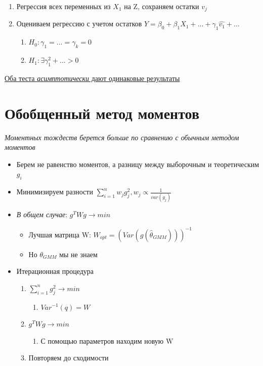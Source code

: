 \documentclass[a4paper, 12pt]{article}
\begin{document}
\begin{enumerate}
    \item Регрессия всех переменных из $X_{1}$ на Z, сохраняем остатки $v_{j}$
    \item Оцениваем регрессию с учетом остатков $Y = \beta_{0} + \beta_{1}X_{1} + ... + \gamma_{1}\hat{v_{1}} + ...$
    \begin{enumerate}
        \item $H_{0}: \gamma_{1} = ... = \gamma_{k} = 0$
        \item $H_{1}: \exists \gamma_{1}^{2} + ... > 0$
    \end{enumerate}
\end{enumerate}

\begin{center}
    \underline{Оба теста \textit{асимптотически} дают одинаковые результаты}
\end{center}

\section{Обобщенный метод моментов}

\textit{Моментных тождеств берется больше по сравнению с обычным методом моментов}

\begin{itemize}
    \item Берем не равенство моментов, а разницу между выборочным и теоретическим $g_{i}$
    \item Минимизируем разности $\sum_{i = 1}^{n}w_{j}g_{j}^{2}, w_{j} \propto \frac{1}{var(g_{j})}$
    \item \textit{В общем случае}: $g^{T}Wg \rightarrow min$
    \begin{itemize}
        \item Лучшая матрица W: $W_{opt} = (Var(g(\hat{\theta}_{GMM})))^{-1}$
        \item Но $\theta_{GMM}$ мы не знаем
    \end{itemize}
    \item Итерационная процедура
    \begin{enumerate}
        \item $\sum_{i = 1}^{n}g_{j}^{2} \rightarrow min$
        \begin{enumerate}
            \item $Var^{-1}(q) = W$
        \end{enumerate}
        \item $g^{T}Wg \rightarrow min$
        \begin{enumerate}
            \item С помощью параметров находим новую W
        \end{enumerate}
        \item Повторяем до сходимости
    \end{enumerate}
\end{itemize}
\end{document}
